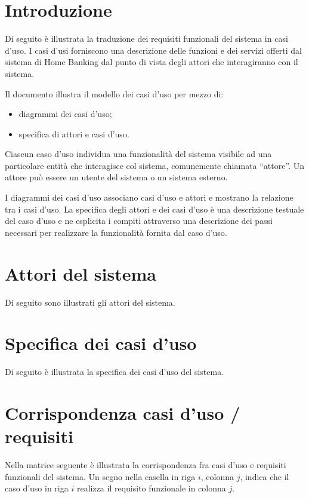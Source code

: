 \documentclass[10pt]{softeng} %
\begin{document}
\startofdocument{}

\section{Introduzione}

Di seguito \`e illustrata la traduzione dei requisiti funzionali del sistema in casi d'uso.
I casi d'usi forniscono una descrizione delle funzioni e dei servizi offerti dal sistema di Home Banking dal punto di vista degli attori che interagiranno con il sistema.

Il documento illustra il modello dei casi d'uso per mezzo di:
\begin{itemize}
	\item diagrammi dei casi d'uso;
	\item specifica di attori e casi d'uso.
\end{itemize}

Ciascun caso d'uso individua una funzionalit\`a del sistema visibile ad una particolare entit\`a che interagisce col sistema, comunemente chiamata ``attore''.
Un attore pu\`o essere un utente del sistema o un sistema esterno.

I diagrammi dei casi d'uso associano casi d'uso e attori e mostrano la relazione tra i casi d'uso.
La specifica degli attori e dei casi d'uso \`e una descrizione testuale del caso d'uso e ne esplicita i compiti attraverso una descrizione dei passi necessari per realizzare la funzionalit\`a fornita dal caso d'uso.

\section{Attori del sistema}

Di seguito sono illustrati gli attori del sistema.

\section{Specifica dei casi d'uso}

Di seguito \`e illustrata la specifica dei casi d'uso del sistema.

\section{Corrispondenza casi d'uso / requisiti}

Nella matrice seguente \`e illustrata la corrispondenza fra casi d'uso e requisiti funzionali del sistema.
Un segno nella casella in riga $i$, colonna $j$, indica che il caso d'uso in riga $i$ realizza il requisito funzionale in colonna $j$.
\end{document}
